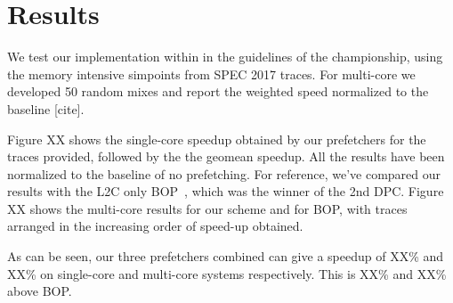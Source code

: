 \section{Results}
\label{Results}

We test our implementation within in the guidelines of the championship, using the
memory intensive simpoints from SPEC 2017 traces. For multi-core we developed 50
random mixes and report the weighted speed normalized to the baseline [cite].

Figure XX shows the single-core speedup obtained by our prefetchers for the traces 
provided, followed by the the geomean speedup. All the results have
been normalized to the baseline of no prefetching. For reference, we've compared
our results with the L2C only BOP~\cite{BOP}, which was the winner of the 2nd DPC.
Figure XX shows the multi-core results for our scheme and for BOP, with traces 
arranged in the increasing order of speed-up obtained.

As can be seen, our three prefetchers combined can give a speedup of XX\% and XX\%
on single-core and multi-core systems respectively. This is XX\% and XX\% above BOP.
